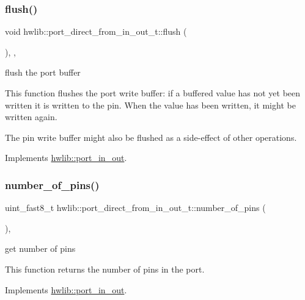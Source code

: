 \subsubsection{\texorpdfstring{flush()}{flush()}}
{\footnotesize\ttfamily void hwlib\+::port\+\_\+direct\+\_\+from\+\_\+in\+\_\+out\+\_\+t\+::flush (\begin{DoxyParamCaption}{ }\end{DoxyParamCaption})\hspace{0.3cm}{\ttfamily [inline]}, {\ttfamily [override]}, {\ttfamily [virtual]}}

flush the port buffer

This function flushes the port write buffer\+: if a buffered value has not yet been written it is written to the pin. When the value has been written, it might be written again.

The pin write buffer might also be flushed as a side-\/effect of other operations. 

Implements \hyperlink{classhwlib_1_1port__in__out_a164564bcd08c137f0ff2e6445e9cfe5e}{hwlib\+::port\+\_\+in\+\_\+out}.

\mbox{\label{classhwlib_1_1port__direct__from__in__out__t_a7b9bed1806a7597e886404637d1fdf7e}} 
\subsubsection{\texorpdfstring{number\+\_\+of\+\_\+pins()}{number\_of\_pins()}}
{\footnotesize\ttfamily uint\+\_\+fast8\+\_\+t hwlib\+::port\+\_\+direct\+\_\+from\+\_\+in\+\_\+out\+\_\+t\+::number\+\_\+of\+\_\+pins (\begin{DoxyParamCaption}{ }\end{DoxyParamCaption})\hspace{0.3cm}{\ttfamily [inline]}, {\ttfamily [virtual]}}

get number of pins

This function returns the number of pins in the port. 

Implements \hyperlink{classhwlib_1_1port__in__out_a44243a6c7664e734563f1809058751bc}{hwlib\+::port\+\_\+in\+\_\+out}.

